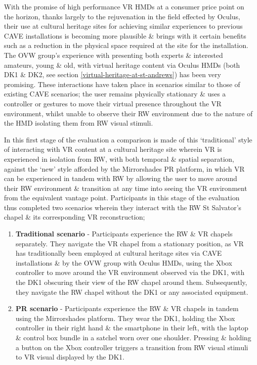 With the promise of high performance VR HMDs at a consumer price point on the horizon, thanks largely to the rejuvenation in the field effected by Oculus, their use at cultural heritage sites for achieving similar experiences to previous CAVE installations is becoming more plausible \& brings with it certain benefits such as a reduction in the physical space required at the site for the installation. The OVW group's experience with presenting both experts \& interested amateurs, young \& old, with virtual heritage content via Oculus HMDs (both DK1 \& DK2, see section \ref{virtual-heritage-at-st-andrews}) has been very promising. These interactions have taken place in scenarios similar to those of existing CAVE scenarios; the user remains physically stationary \& uses a controller or gestures to move their virtual presence throughout the VR environment, whilst unable to observe their RW environment due to the nature of the HMD isolating them from RW visual stimuli.

In this first stage of the evaluation a comparison is made of this `traditional' style of interacting with VR content at a cultural heritage site wherein VR is experienced in isolation from RW, with both temporal \& spatial separation, against the `new' style afforded by the Mirrorshades PR platform, in which VR can be experienced in tandem with RW by allowing the user to move around their RW environment \& transition at any time into seeing the VR environment from the equivalent vantage point. Participants in this stage of the evaluation thus completed two scenarios wherein they interact with the RW St Salvator's chapel \& its corresponding VR reconstruction;

\begin{enumerate}
	\item \textbf{Traditional scenario} - Participants experience the RW \& VR chapels separately. They navigate the VR chapel from a stationary position, as VR has traditionally been employed at cultural heritage sites via CAVE installations \& by the OVW group with Oculus HMDs, using the Xbox controller to move around the VR environment observed via the DK1, with the DK1 obscuring their view of the RW chapel around them. Subsequently, they navigate the RW chapel without the DK1 or any associated equipment.
	\item \textbf{PR scenario} - Participants experience the RW \& VR chapels in tandem using the Mirrorshades platform. They wear the DK1, holding the Xbox controller in their right hand \& the smartphone in their left, with the laptop \& control box bundle in a satchel worn over one shoulder. Pressing \& holding a button on the Xbox controller triggers a transition from RW visual stimuli to VR visual displayed by the DK1.
\end{enumerate}

